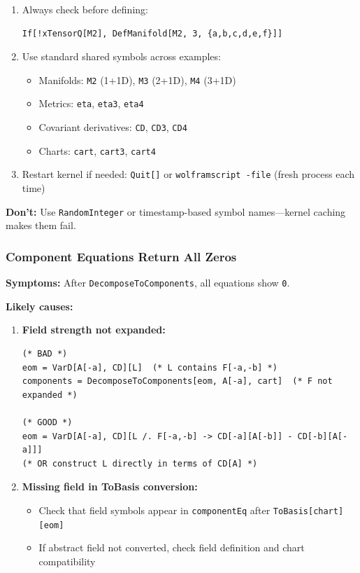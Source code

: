 \begin{enumerate}
  \item Always check before defining:

\begin{lstlisting}[style=mathematica]
If[!xTensorQ[M2], DefManifold[M2, 3, {a,b,c,d,e,f}]]
\end{lstlisting}

  \item Use standard shared symbols across examples:
  \begin{itemize}
    \item Manifolds: \texttt{M2} (1+1D), \texttt{M3} (2+1D), \texttt{M4} (3+1D)
    \item Metrics: \texttt{eta}, \texttt{eta3}, \texttt{eta4}
    \item Covariant derivatives: \texttt{CD}, \texttt{CD3}, \texttt{CD4}
    \item Charts: \texttt{cart}, \texttt{cart3}, \texttt{cart4}
  \end{itemize}

  \item Restart kernel if needed: \texttt{Quit[]} or \texttt{wolframscript -file} (fresh process each time)
\end{enumerate}

\textbf{Don't:} Use \texttt{RandomInteger} or timestamp-based symbol names---kernel caching makes them fail.

\subsubsection{Component Equations Return All Zeros}

\textbf{Symptoms:} After \texttt{DecomposeToComponents}, all equations show \texttt{0}.

\textbf{Likely causes:}

\begin{enumerate}
  \item \textbf{Field strength not expanded:}

\begin{lstlisting}[style=mathematica]
(* BAD *)
eom = VarD[A[-a], CD][L]  (* L contains F[-a,-b] *)
components = DecomposeToComponents[eom, A[-a], cart]  (* F not expanded *)

(* GOOD *)
eom = VarD[A[-a], CD][L /. F[-a,-b] -> CD[-a][A[-b]] - CD[-b][A[-a]]]
(* OR construct L directly in terms of CD[A] *)
\end{lstlisting}

  \item \textbf{Missing field in ToBasis conversion:}
  \begin{itemize}
    \item Check that field symbols appear in \texttt{componentEq} after \texttt{ToBasis[chart][eom]}
    \item If abstract field not converted, check field definition and chart compatibility
  \end{itemize}
\end{enumerate}

